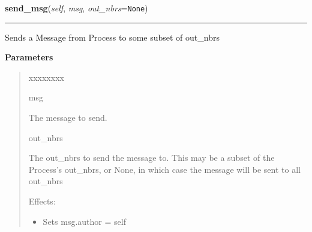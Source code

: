 \hspace{.8\funcindent}\begin{boxedminipage}{\funcwidth}

    \raggedright \textbf{send\_msg}(\textit{self}, \textit{msg}, \textit{out\_nbrs}={\tt None})

    \vspace{-1.5ex}

    \rule{\textwidth}{0.5\fboxrule}
\setlength{\parskip}{2ex}
    Sends a Message from Process to some subset of out\_nbrs

\setlength{\parskip}{1ex}
      \textbf{Parameters}
      \vspace{-1ex}

      \begin{quote}
        \begin{Ventry}{xxxxxxxx}

          \item[msg]

          The message to send.

          \item[out\_nbrs]

          The out\_nbrs to send the message to. This may be a subset of the
          Process's out\_nbrs, or None, in which case the message will be 
          sent to all out\_nbrs

          Effects:

          \begin{itemize}
          \setlength{\parskip}{0.6ex}
            \item Sets msg.author = self

          \end{itemize}

        \end{Ventry}

      \end{quote}

    \end{boxedminipage}

    \label{datk:core:distalgs:Process:get_msgs}

    \vspace{0.5ex}

